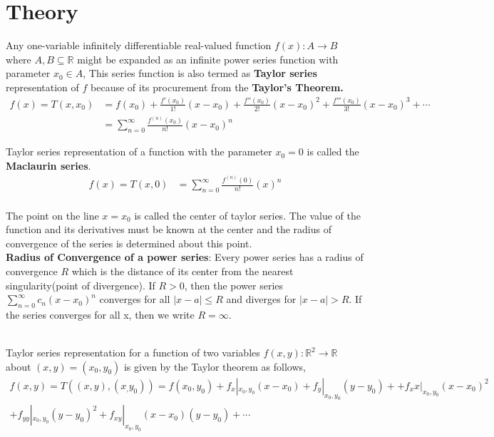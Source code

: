 \documentclass[12pt]{article}
\begin{document}



\section{Theory}

Any one-variable infinitely differentiable real-valued function $ f(x): A \rightarrow B $ where $A,B \subseteq \mathbb{R}$ might be expanded as an infinite power series function with parameter $ x_0 \in A $, This series function is also termed as \textbf{Taylor series} representation of $ f $ because of its procurement from the \textbf{Taylor's Theorem.}   
\begin{align}
	f(x) = T(x,x_0) &= f(x_0)+{\frac {f'(x_0)}{1!}}(x-x_0)+{\frac {f''(x_0)}{2!}}(x-x_0)^{2}+{\frac {f'''(x_0)}{3!}}(x-x_0)^{3}+\cdots \nonumber\\
	 &= \sum _{n=0}^{\infty }{\frac {f^{(n)}(x_0)}{n!}}(x-x_0)^{n} \qquad \qquad \qquad\qquad\qquad 
\end{align}

\noindent
Taylor series representation of a function with the parameter $ x_0 = 0 $ is called the \textbf{Maclaurin series}.
\begin{align}
	f(x) = T(x,0) &= \sum _{n=0}^{\infty }{\frac {f^{(n)}(0)}{n!}}(x)^{n} 
\end{align}
\\
The point on the line $ x = x_0 $ is called the center of taylor series. The value of the function and its derivatives must be known at the center and the radius of convergence of the series is determined about this point.\\[3mm]
\noindent
\textbf{Radius of Convergence of a power series}: Every power series has a radius of convergence $R$ which is the distance of its center from the nearest singularity(point of divergence).
If $R > 0$, then the power series $ \sum_{n=0}^{\infty} {c_n (x-x_0)^n}$ converges for all $ |x-a|\leq R $ and diverges for $ |x-a| > R $. If the series converges for all x, then we write $ R=\infty $. 

\noindent \\
Taylor series representation for a function of two variables $ f(x,y): \mathbb{R}^2 \rightarrow \mathbb{R} $ about $(x,y) = (x_0,y_0)$ is given by the Taylor theorem as follows,
\begin{align}
	f(x,y) = T((x,y),(x_,y_0)) = f(x_0,y_0) + f_x|_{x_0,y_0}(x-x_0) + f_y|_{x_0,y_0}(y-y_0) + + f_xx|_{x_0,y_0}(x-x_0)^2 \nonumber\\ + f_{yy}|_{x_0,y_0}(y-y_0)^2 + f_{xy}|_{x_0,y_0}(x-x_0)(y-y_0) + \cdots
\end{align}
\end{document}
